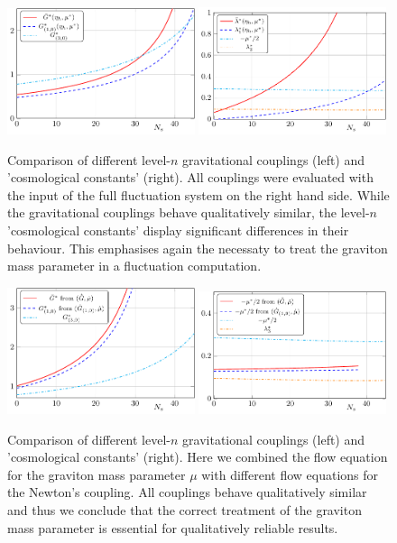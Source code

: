 \documentclass[11pt]{book} %
\begin{document}
{\begin{figure}[!ht]
\includegraphics[width=0.49\textwidth]{All-g-from-fluc}
\hfill
\includegraphics[width=0.49\textwidth]{All-lam-from-fluc}
\caption{
Comparison of different level-$n$ gravitational couplings (left) and 'cosmological constants' (right).
All couplings were evaluated with the input of the full fluctuation system on the right hand side.
While the gravitational couplings behave qualitatively similar, the level-$n$ 'cosmological constants' display significant differences in their behaviour.
This emphasises again the necessaty to treat the graviton mass parameter in a fluctuation computation.
}
\label{fig:All-from-fluc}
\end{figure}

\begin{figure}[!ht]
\includegraphics[width=0.49\textwidth]{All-g-from-mu}
\hfill
\includegraphics[width=0.49\textwidth]{All-lam-from-mu}
\caption{Comparison of different level-$n$ gravitational couplings (left) and 'cosmological constants' (right).
Here we combined the flow equation for the graviton mass parameter $\mu$ with different flow equations for the Newton's coupling.
All couplings behave qualitatively similar and thus we conclude that the correct treatment of the graviton mass parameter is essential for qualitatively reliable results.}
\label{fig:All-from-mu}
\end{figure}


}
\end{document}
